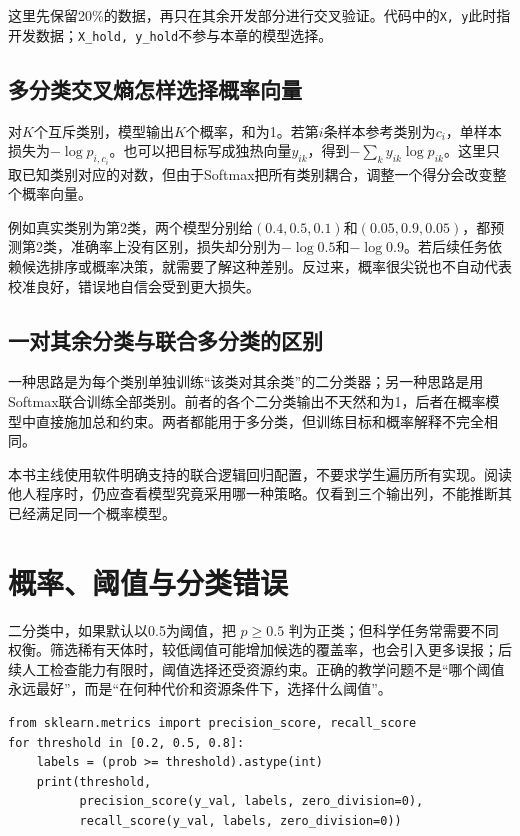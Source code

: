 这里先保留20\%的数据，再只在其余开发部分进行交叉验证。代码中的\texttt{X, y}此时指开发数据；\texttt{X\_hold, y\_hold}不参与本章的模型选择。

\subsection{多分类交叉熵怎样选择概率向量}
对$K$个互斥类别，模型输出$K$个概率，和为1。若第$i$条样本参考类别为$c_i$，单样本损失为$-\log p_{i,c_i}$。也可以把目标写成独热向量$y_{ik}$，得到$-\sum_k y_{ik}\log p_{ik}$。这里只取已知类别对应的对数，但由于Softmax把所有类别耦合，调整一个得分会改变整个概率向量。

例如真实类别为第2类，两个模型分别给$(0.4,0.5,0.1)$和$(0.05,0.9,0.05)$，都预测第2类，准确率上没有区别，损失却分别为$-\log0.5$和$-\log0.9$。若后续任务依赖候选排序或概率决策，就需要了解这种差别。反过来，概率很尖锐也不自动代表校准良好，错误地自信会受到更大损失。

\subsection{一对其余分类与联合多分类的区别}
一种思路是为每个类别单独训练“该类对其余类”的二分类器；另一种思路是用Softmax联合训练全部类别。前者的各个二分类输出不天然和为1，后者在概率模型中直接施加总和约束。两者都能用于多分类，但训练目标和概率解释不完全相同。

本书主线使用软件明确支持的联合逻辑回归配置，不要求学生遍历所有实现。阅读他人程序时，仍应查看模型究竟采用哪一种策略。仅看到三个输出列，不能推断其已经满足同一个概率模型。

\section{概率、阈值与分类错误}
二分类中，如果默认以0.5为阈值，把 $p\geq0.5$ 判为正类；但科学任务常需要不同权衡。筛选稀有天体时，较低阈值可能增加候选的覆盖率，也会引入更多误报；后续人工检查能力有限时，阈值选择还受资源约束。正确的教学问题不是“哪个阈值永远最好”，而是“在何种代价和资源条件下，选择什么阈值”。

\begin{lstlisting}[caption={通过开发集概率检查阈值的取舍}]
from sklearn.metrics import precision_score, recall_score
for threshold in [0.2, 0.5, 0.8]:
    labels = (prob >= threshold).astype(int)
    print(threshold,
          precision_score(y_val, labels, zero_division=0),
          recall_score(y_val, labels, zero_division=0))
\end{lstlisting}

